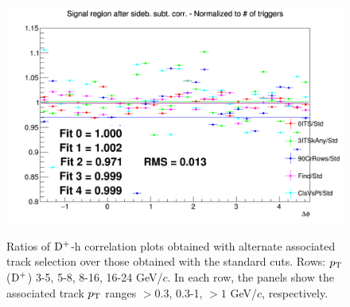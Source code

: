 \begin{figure}
{\includegraphics[width=0.31\linewidth]{Centrality_DPlus/Dplus/Systematic/0_20/Tracks_0_20/Ratio_AzimCorrDistr_Dplus_Canvas_PtIntBins11to11_PoolInt_thr1dotto99dot.png}} \\
 \caption{Ratios of ${\rm D^+}$-h correlation plots obtained with alternate associated track selection over those obtained with the standard cuts. Rows: $p_{\rm T}$(${\rm D^+}$) 3-5, 5-8, 8-16, 16-24 GeV/$c$. In each row, the panels show the associated track
$p_{\rm T}$ ranges $> 0.3$, 0.3-1, $> 1$ GeV/$c$, respectively.}
\label{fig:SysTrEff020_Dplus}
\end{figure}


